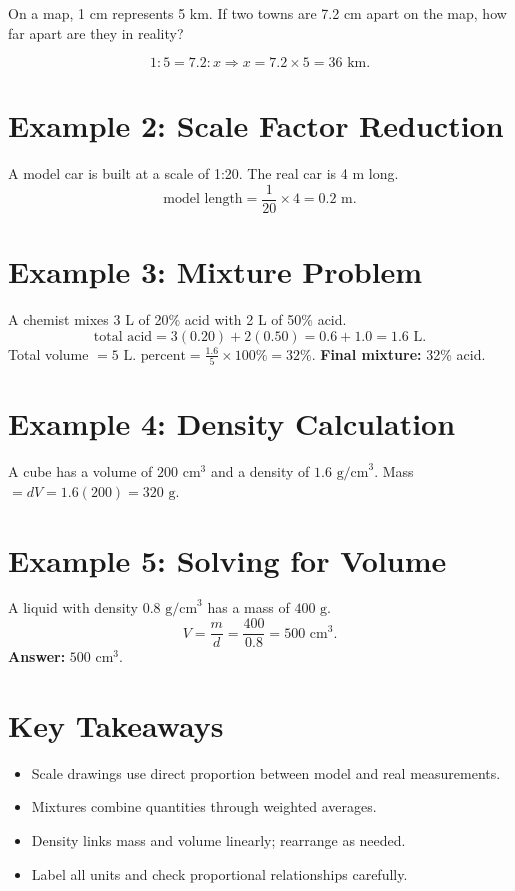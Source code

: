 \documentclass[14pt]{extarticle}
\begin{document}
On a map, 1 cm represents 5 km. If two towns are 7.2 cm apart on the map, how far apart are they in reality?

\[
1:5 = 7.2:x \Rightarrow x = 7.2 \times 5 = \boxed{36\text{ km}}.
\]

\section*{Example 2: Scale Factor Reduction}

A model car is built at a scale of 1:20. The real car is 4 m long.  
\[
\text{model length} = \frac{1}{20}\times 4 = \boxed{0.2\text{ m}}.
\]

\section*{Example 3: Mixture Problem}

A chemist mixes 3 L of 20\% acid with 2 L of 50\% acid.  
\[
\text{total acid} = 3(0.20)+2(0.50)=0.6+1.0=1.6\text{ L}.
\]
Total volume \(=5\text{ L}\).  
\(\text{percent}=\frac{1.6}{5}\times100\%=32\%\).  
\textbf{Final mixture:} 32\% acid.

\section*{Example 4: Density Calculation}

A cube has a volume of \(200\text{ cm}^3\) and a density of \(1.6\text{ g/cm}^3\).
Mass \(=dV=1.6(200)=\boxed{320\text{ g}}\).

\section*{Example 5: Solving for Volume}

A liquid with density \(0.8\text{ g/cm}^3\) has a mass of \(400\text{ g}\).  
\[
V=\frac{m}{d}=\frac{400}{0.8}=500\text{ cm}^3.
\]
\textbf{Answer:} \(\boxed{500\text{ cm}^3}\).

\section*{Key Takeaways}
\begin{itemize}
  \item Scale drawings use direct proportion between model and real measurements.
  \item Mixtures combine quantities through weighted averages.
  \item Density links mass and volume linearly; rearrange as needed.
  \item Label all units and check proportional relationships carefully.
\end{itemize}
\end{document}
